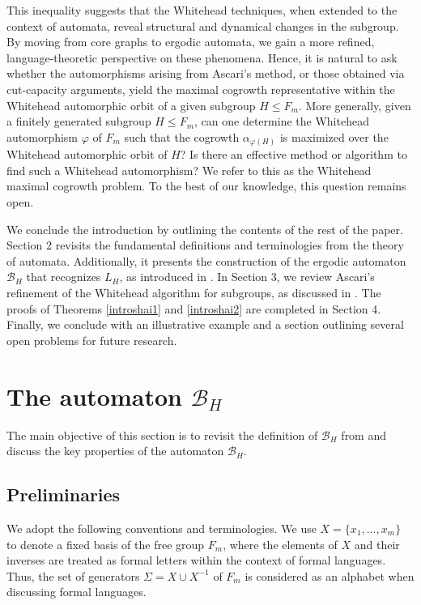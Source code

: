 \documentclass{article}
\newcommand{\B}{\mathcal{B}}
\begin{document}
This inequality suggests that the Whitehead techniques, when extended to the context of automata, reveal structural and dynamical changes in the subgroup. By moving from core graphs to ergodic automata, we gain a more refined, language-theoretic perspective on these phenomena. Hence, it is natural to ask whether the automorphisms arising from Ascari’s method, or those obtained via cut-capacity arguments, yield the maximal cogrowth representative within the Whitehead automorphic orbit of a given subgroup $H \leq F_m$. More generally, 
given a finitely generated subgroup $H \leq F_m$, can one determine the Whitehead automorphism $\varphi$ of $F_m$ such that the cogrowth $\alpha_{\varphi(H)}$ is maximized over the Whitehead automorphic orbit of $H$? Is there an effective method or algorithm to find such a Whitehead automorphism? We refer to this as the Whitehead maximal cogrowth problem. To the best of our knowledge, this question remains open.

We conclude the introduction by outlining the contents of the rest of the paper. Section 2 revisits the fundamental definitions and terminologies from the theory of automata. Additionally, it presents the construction of the ergodic automaton $\B_H$ that recognizes $L_H$, as introduced in \cite{DGS2021}. In Section 3, we review Ascari's refinement of the Whitehead algorithm for subgroups, as discussed in \cite{ascari2021fine}. The proofs of Theorems \ref{introshai1} and \ref{introshai2} are completed in Section 4. Finally, we conclude with an illustrative example and a section outlining several open problems for future research.

\section{The automaton $\B_H$}
The main objective of this section is to revisit the definition of $\B_H$ from \cite{DGS2021} and discuss the key properties of the automaton $\B_H$. 
\subsection{Preliminaries}
We adopt the following conventions and terminologies. We use $X=\{x_1, \ldots, x_m\}$ to denote a fixed basis of the free group $F_m$, where the elements of $X$ and their inverses are treated as formal letters within the context of formal languages. Thus, the set of generators $\Sigma = X \cup X^{-1}$ of $F_m$ is considered as an alphabet when discussing formal languages.
\end{document}
